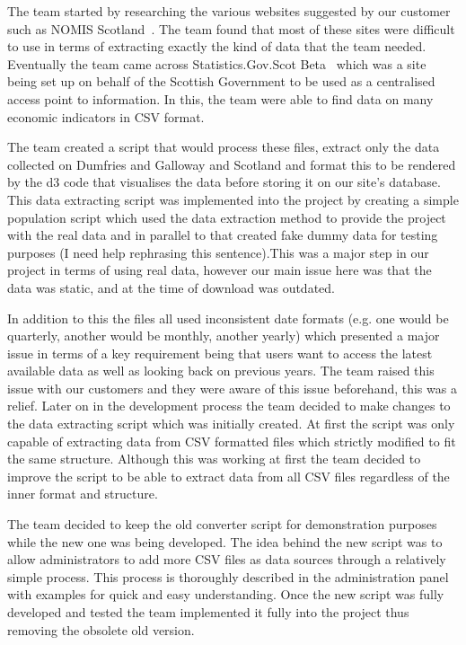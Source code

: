\documentclass{l3proj}
\begin{document}
The team started by researching the various websites suggested by our customer such as NOMIS Scotland~\cite{NOMISScot}. The team found that most of these sites were difficult to use in terms of extracting exactly the kind of data that the team needed. Eventually the team came across Statistics.Gov.Scot Beta~\cite{StatisticsScotBeta} which was a site being set up on behalf of the Scottish Government to be used as a centralised access point to information. In this, the team were able to find data on many economic indicators in CSV format.

The team created a script that would process these files, extract only the data collected on Dumfries and Galloway and Scotland and format this to be rendered by the d3 code that visualises the data before storing it on our site's database. This data extracting script was implemented into the project by creating a simple population script which used the data extraction method to provide the project with the real data and in parallel to that created fake dummy data for testing purposes (I need help rephrasing this sentence).This was a major step in our project in terms of using real data, however our main issue here was that the data was static, and at the time of download was outdated.

In addition to this the files all used inconsistent date formats (e.g. one would be quarterly, another would be monthly, another yearly) which presented a major issue in terms of a key requirement being that users want to access the latest available data as well as looking back on previous years. The team raised this issue with our customers and they were aware of this issue beforehand, this was a relief. Later on in the development process the team decided to make changes to the data extracting script which was initially created. At first the script was only capable of extracting data from CSV formatted files which strictly modified to fit the same structure. Although this was working at first the team decided to improve the script to be able to extract data from all CSV files regardless of the inner format and structure.

The team decided to keep the old converter script for demonstration purposes while the new one was being developed. The idea behind the new script was to allow administrators to add more CSV files as data sources through a relatively simple process. This process is thoroughly described in the administration panel with examples for quick and easy understanding. Once the new script was fully developed and tested the team implemented it fully into the project thus removing the obsolete old version.
\end{document}
